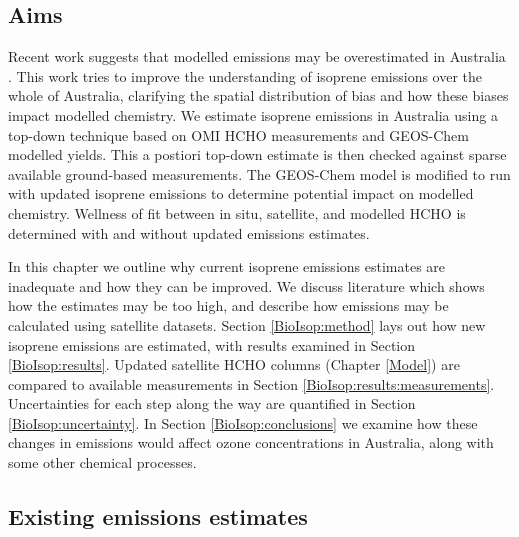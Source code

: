   \subsection{Aims}
    \label{BioIsop:intro:aims}
    
    Recent work suggests that modelled emissions may be overestimated in Australia \parencite{Emmerson2016}.
    This work tries to improve the understanding of isoprene emissions over the whole of Australia, clarifying the spatial distribution of bias and how these biases impact modelled chemistry.
    We estimate isoprene emissions in Australia using a top-down technique based on OMI HCHO measurements and GEOS-Chem modelled yields.
    This a postiori top-down estimate is then checked against sparse available ground-based measurements.
    The GEOS-Chem model is modified to run with updated isoprene emissions to determine potential impact on modelled chemistry.
    Wellness of fit between in situ, satellite, and modelled HCHO is determined with and without updated emissions estimates.
    
    
    In this chapter we outline why current isoprene emissions estimates are inadequate and how they can be improved.
    We discuss literature which shows how the estimates may be too high, and describe how emissions may be calculated using satellite datasets.
    Section \ref{BioIsop:method} lays out how new isoprene emissions are estimated, with results examined in Section \ref{BioIsop:results}. 
    Updated satellite HCHO columns (Chapter \ref{Model}) are compared to available measurements in Section \ref{BioIsop:results:measurements}.
    Uncertainties for each step along the way are quantified in Section \ref{BioIsop:uncertainty}.
    In Section \ref{BioIsop:conclusions} we examine how these changes in emissions would affect ozone concentrations in Australia, along with some other chemical processes.
    
    
  \subsection{Existing emissions estimates}
    
